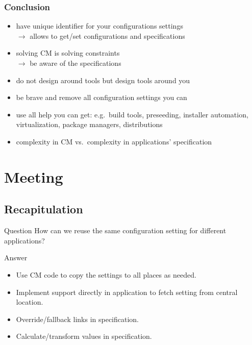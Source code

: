 \begin{frame}
	\frametitle{Conclusion}

	\begin{itemize}[<+-| alert@+>]
	\item have unique identifier for your configurations settings \\ $\rightarrow$ allows to get/set configurations and specifications
	\item solving CM is solving constraints \\ $\rightarrow$ be aware of the specifications
	\item do not design around tools but design tools around you
	\item be brave and remove all configuration settings you can
	\item use all help you can get: e.g.\ build tools, preseeding, installer automation, virtualization, package managers, distributions
	\item complexity in CM vs.\ complexity in applications' specification
	\end{itemize}
\end{frame}



\section{Meeting}

\subsection{Recapitulation}

\begin{frame}
	\begin{alertblock}{Question}
	How can we reuse the same configuration setting for different applications?
	\end{alertblock}

	\pause
	\begin{exampleblock}{Answer}
	\begin{itemize}
	\item Use CM code to copy the settings to all places as needed.
	\item Implement support directly in application to fetch setting from central location.
	\item Override/fallback links in specification.
	\item Calculate/transform values in specification.
	\end{itemize}
	\end{exampleblock}
\end{frame}

